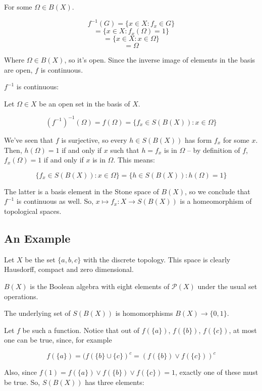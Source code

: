 \documentclass{article}
\begin{document}
      For some $\Omega \in B(X)$.

      \[f^{-1}(G) = \{x \in X : f_x \in G\}\]
      \[ = \{x \in X : f_x(\Omega) = 1\}\]
      \[ = \{x \in X : x \in \Omega\}\]
      \[ = \Omega\]

      Where $\Omega \in B(X)$, so it's open. Since the inverse image of elements
      in the basis are open, $f$ is continuous.

      $f^{-1}$ is continuous:

      Let $\Omega \in X$ be an open set in the basis of $X$.

      \[(f^{-1})^{-1}(\Omega) = f(\Omega) = \{f_x \in S(B(X)) : x \in \Omega\}\]

      We've seen that $f$ is surjective, so every $h \in S(B(X))$ has form $f_x$
      for some $x$. Then, $h(\Omega) = 1$ if and only if $x$ such that $h = f_x$
      is in $\Omega$ -- by definition of $f$, $f_x(\Omega) = 1$ if and only if
      $x$ is in $\Omega$. This means:

      \[\{f_x \in S(B(X)) : x \in \Omega\} = \{h \in S(B(X)) : h(\Omega) = 1\}\]

      The latter is a basis element in the Stone space of $B(X)$, so we conclude
      that $f^{-1}$ is continuous as well. So, $x \mapsto f_x: X \rightarrow
      S(B(X))$ is a homeomorphism of topological spaces.

      \subsection{An Example}

        Let $X$ be the set $\{a,b,c\}$ with the discrete topology. This space is
        clearly Hausdorff, compact and zero dimensional.

        $B(X)$ is the Boolean algebra with eight elements of $\mathcal{P}(X)$
        under the usual set operations.

        The underlying set of $S(B(X))$ is homomorphisms $B(X) \to \{0,1\}$.

        Let $f$ be such a function. Notice that out of $f(\{a\})$, $f(\{b\})$,
        $f(\{c\})$, at most one can be true, since, for example

        \[f(\{a\}) = (f(\{b\} \cup \{c\})^c = (f(\{b\}) \vee f(\{c\}))^c\]

        Also, since $f(1) = f(\{a\}) \vee f(\{b\}) \vee f(\{c\}) = 1$, exactly
        one of these must be true. So, $S(B(X))$ has three elements:
\end{document}

